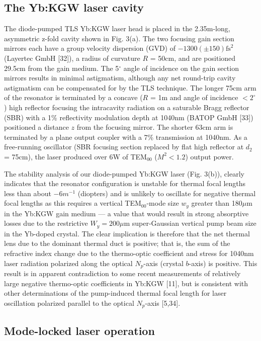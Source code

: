 \subsection{The Yb:KGW laser cavity}

The diode-pumped TLS Yb:KGW laser head is placed in the 2.35m-long, asymmetric z-fold cavity shown in Fig. 3(a).
The two focusing gain section mirrors each have a group velocity dispersion (GVD) of $-1300 ( \pm 150 ) \text{fs}^2$ (Layertec GmbH [32]), a radius of curvature $R$ = 50cm, and are positioned 29.5cm from the gain medium.
The 5$^\circ$ angle of incidence on the gain section mirrors results in minimal astigmatism, although any net round-trip cavity astigmatism can be compensated for by the TLS technique.
The longer 75cm arm of the resonator is terminated by a concave ($R$ = 1m and angle of incidence $< 2^\circ$) high reflector
focusing the intracavity radiation on a saturable Bragg reflector (SBR) with a 1\% reflectivity modulation depth at 1040nm (BATOP GmbH [33]) positioned a distance $z$ from the focusing mirror.
The shorter 63cm arm is terminated by a plane output coupler with a 7\% transmission at 1040nm.
As a free-running oscillator (SBR focusing section replaced by flat high reflector at $d_2$ = 75cm), the laser produced over 6W of TEM$_{00}$ ($M^2 < 1.2$) output power.

The stability analysis of our diode-pumped Yb:KGW laser (Fig. 3(b)), clearly indicates that the resonator configuration is unstable for thermal focal lengths less than about $-6m^{-1}$ (diopters) and is unlikely to oscillate for negative thermal focal lengths as this requires a vertical TEM$_{00}$-mode size $w_y$ greater than 180$\mu$m in the Yb:KGW gain medium --- a value that would result in strong absorptive losses due to the restrictive $W_y = 200\mu$m super-Gaussian vertical pump beam size in the Yb-doped crystal.
The clear implication is therefore that the net thermal lens due to the dominant thermal duct is positive; that is, the sum of the refractive index change due to the thermo-optic coefficient and stress for 1040nm laser radiation polarized along the optical $N_p$-axis (crystal $b$-axis) is positive.
This result is in apparent contradiction to some recent measurements of relatively large negative thermo-optic coefficients in Yb:KGW [11], but is consistent with other determinations of the pump-induced thermal focal length for laser oscillation polarized parallel to the optical $N_p$-axis [5,34].

\subsection{Mode-locked laser operation}

